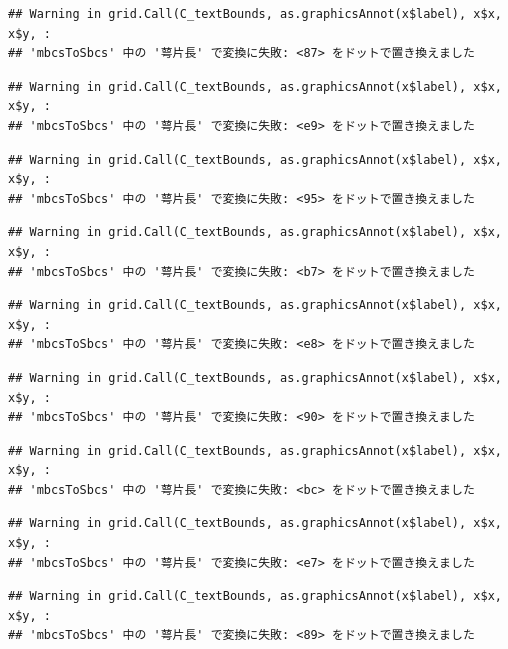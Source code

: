 \documentclass[
]{book}
\begin{document}
\begin{verbatim}
## Warning in grid.Call(C_textBounds, as.graphicsAnnot(x$label), x$x, x$y, :
## 'mbcsToSbcs' 中の '萼片長' で変換に失敗: <87> をドットで置き換えました
\end{verbatim}

\begin{verbatim}
## Warning in grid.Call(C_textBounds, as.graphicsAnnot(x$label), x$x, x$y, :
## 'mbcsToSbcs' 中の '萼片長' で変換に失敗: <e9> をドットで置き換えました
\end{verbatim}

\begin{verbatim}
## Warning in grid.Call(C_textBounds, as.graphicsAnnot(x$label), x$x, x$y, :
## 'mbcsToSbcs' 中の '萼片長' で変換に失敗: <95> をドットで置き換えました
\end{verbatim}

\begin{verbatim}
## Warning in grid.Call(C_textBounds, as.graphicsAnnot(x$label), x$x, x$y, :
## 'mbcsToSbcs' 中の '萼片長' で変換に失敗: <b7> をドットで置き換えました
\end{verbatim}

\begin{verbatim}
## Warning in grid.Call(C_textBounds, as.graphicsAnnot(x$label), x$x, x$y, :
## 'mbcsToSbcs' 中の '萼片長' で変換に失敗: <e8> をドットで置き換えました
\end{verbatim}

\begin{verbatim}
## Warning in grid.Call(C_textBounds, as.graphicsAnnot(x$label), x$x, x$y, :
## 'mbcsToSbcs' 中の '萼片長' で変換に失敗: <90> をドットで置き換えました
\end{verbatim}

\begin{verbatim}
## Warning in grid.Call(C_textBounds, as.graphicsAnnot(x$label), x$x, x$y, :
## 'mbcsToSbcs' 中の '萼片長' で変換に失敗: <bc> をドットで置き換えました
\end{verbatim}

\begin{verbatim}
## Warning in grid.Call(C_textBounds, as.graphicsAnnot(x$label), x$x, x$y, :
## 'mbcsToSbcs' 中の '萼片長' で変換に失敗: <e7> をドットで置き換えました
\end{verbatim}

\begin{verbatim}
## Warning in grid.Call(C_textBounds, as.graphicsAnnot(x$label), x$x, x$y, :
## 'mbcsToSbcs' 中の '萼片長' で変換に失敗: <89> をドットで置き換えました
\end{verbatim}
\end{document}
